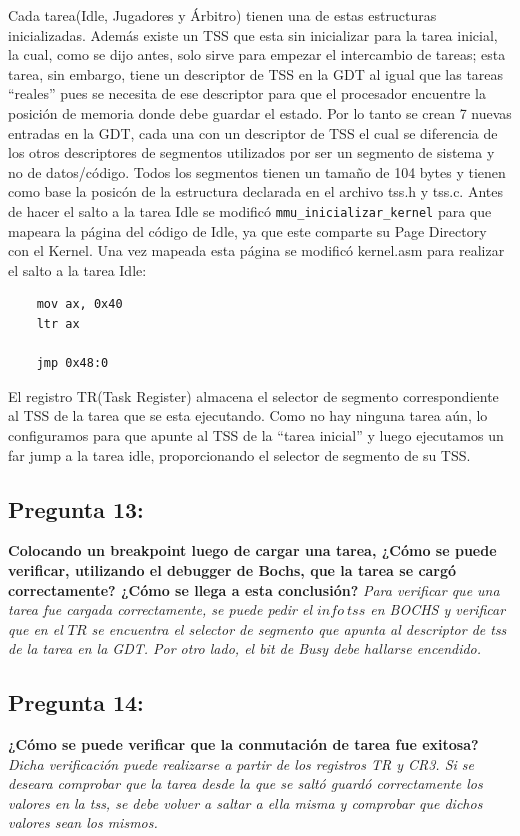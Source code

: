\documentclass[10pt, a4paper]{article}
\begin{document}
Cada tarea(Idle, Jugadores y \'Arbitro) tienen una de estas estructuras inicializadas. Adem\'as existe un TSS que esta sin inicializar para la tarea inicial, la cual, como se dijo antes, solo sirve para empezar el intercambio de tareas; esta tarea, sin embargo, tiene un descriptor de TSS en la GDT al igual que las tareas ``reales'' pues se necesita de ese descriptor para que el procesador encuentre la posici\'on de memoria donde debe guardar el estado. Por lo tanto se crean 7 nuevas entradas en la GDT, cada una con un descriptor de TSS el cual se diferencia de los otros descriptores de segmentos utilizados por ser un segmento de sistema y no de datos/c\'odigo. Todos los segmentos tienen un tamaño de 104 bytes y tienen como base la posic\'on de la estructura declarada en el archivo tss.h y tss.c.\newline
Antes de hacer el salto a la tarea Idle se modific\'o \verb+mmu_inicializar_kernel+ para que mapeara la p\'agina del c\'odigo de Idle, ya que este comparte su Page Directory con el Kernel. Una vez mapeada esta p\'agina se modific\'o kernel.asm para realizar el salto a la tarea Idle:
\begin{verbatim}
	mov ax, 0x40
	ltr ax
	
	jmp 0x48:0
\end{verbatim}
El registro TR(Task Register) almacena el selector de segmento correspondiente al TSS de la tarea que se esta ejecutando. Como no hay ninguna tarea a\'un, lo configuramos para que apunte al TSS de la ``tarea inicial'' y luego ejecutamos un far jump a la tarea idle, proporcionando el selector de segmento de su TSS.

{\subsection{Pregunta 13:}} \textbf{Colocando un breakpoint luego de cargar una tarea, ¿Cómo se puede verificar, utilizando el debugger de Bochs, que la tarea se cargó correctamente?
¿Cómo se llega a esta conclusión?}\newline
\newline
\textit{Para verificar que una tarea fue cargada correctamente, se puede pedir el $info\ tss$ en BOCHS y verificar que en el $TR$ se encuentra el selector de segmento que apunta al descriptor de tss de la tarea en la GDT. Por otro lado, el bit de Busy debe hallarse encendido.}

{\subsection{Pregunta 14:}} \textbf{¿Cómo se puede verificar que la conmutación de tarea fue exitosa?}\newline
\newline
\textit{Dicha verificación puede realizarse a partir de los registros TR y CR3. Si se deseara comprobar que la tarea desde la que se saltó guardó correctamente los valores en la tss, se debe volver a saltar a ella misma y comprobar que dichos valores sean los mismos.}
\end{document}
